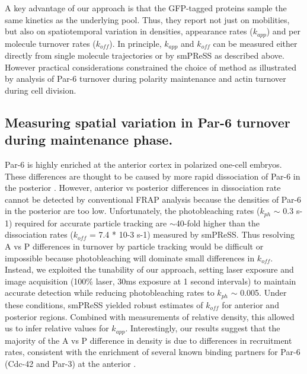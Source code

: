  A key advantage of our approach is that the GFP-tagged proteins sample the same kinetics as the underlying pool. Thus, they report not just on mobilities, but also on spatiotemporal variation in densities, appearance rates ($k_{app}$) and per molecule turnover rates ($k_{off}$). In principle, $k_{app}$ and $k_{off}$ can be measured either directly from single molecule trajectories or by smPReSS as described above. However practical considerations constrained the choice of method as illustrated by analysis of Par-6 turnover during polarity maintenance and actin turnover during cell division.
 
 
 \subsection{Measuring spatial variation in Par-6 turnover during maintenance phase.}
 
 Par-6 is highly enriched at the anterior cortex in polarized one-cell embryos. These differences are thought to be caused by more rapid dissociation of Par-6 in the posterior \cite{nmeth30}. However, anterior vs posterior differences in dissociation rate cannot be detected by conventional FRAP analysis because the densities of Par-6 in the posterior are too low. Unfortunately, the photobleaching rates ($k_{ph}$ $\sim$ 0.3 s-1) required for accurate particle tracking are $\sim$40-fold higher than the dissociation rates ($k_{off}$ = 7.4 * 10-3 s-1) measured by smPReSS. Thus resolving A vs P differences in turnover by particle tracking would be difficult or impossible because photobleaching will dominate small differences in $k_{off}$. Instead, we exploited the tunability of our approach, setting laser exposure and image acquisition (100\% laser, 30ms exposure at 1 second intervals) to maintain accurate detection while reducing photobleaching rates to $k_{ph}$ $\sim$ 0.005. Under these conditions, smPReSS yielded robust estimates of $k_{off}$ for anterior and posterior regions. Combined with measurements of relative density, this allowed us to infer relative values for $k_{app}$. Interestingly, our results suggest that the majority of the A vs P difference in density is due to differences in recruitment rates, consistent with the enrichment of several known binding partners for Par-6 (Cdc-42 and Par-3) at the anterior \cite{nmeth31,nmeth22}.
 
 
 
